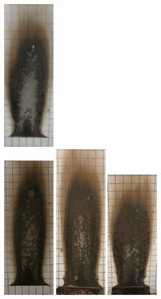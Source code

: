 \documentclass[twoside]{uocthesis}
\begin{document}
\begin{figure}[p]
	\includegraphics[width=1.0in]{../Figures/GBNG5_P5120137} \\

	\includegraphics[width=1.0in]{../Figures/GBNG6_P5120160}
	\includegraphics[width=1.0in]{../Figures/GBNG7_P5120172}
	\includegraphics[width=1.0in]{../Figures/GBNG8_P5120196}

\end{figure}
\end{document}
